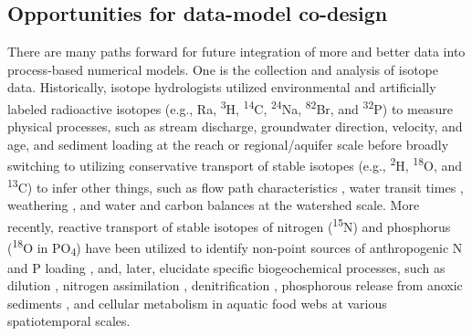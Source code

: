 \documentclass[preprint,review, 12pt]{elsarticle}
\begin{document}
\subsection{Opportunities for data-model co-design}


    There are many paths forward for future integration of more and better data into process-based numerical models. One is the collection and analysis of isotope data. Historically, isotope hydrologists utilized environmental and artificially labeled radioactive isotopes (e.g., Ra, \textsuperscript{3}H, \textsuperscript{14}C, \textsuperscript{24}Na, \textsuperscript{82}Br, and \textsuperscript{32}P) to measure physical processes, such as stream discharge, groundwater direction, velocity, and age, and sediment loading at the reach or regional/aquifer scale \citep{Joly1922, Agency1963, Agency1967} before broadly switching to utilizing conservative transport of stable isotopes (e.g., \textsuperscript{2}H, \textsuperscript{18}O, and \textsuperscript{13}C) to infer other things, such as flow path characteristics \citep{Klaus2013}, water transit times \citep{McGuire2006}, weathering \citep{Schulte2011}, and water \citep{Agency} and carbon \citep{Dawson2011} balances at the watershed scale. More recently, reactive transport of stable isotopes of nitrogen (\textsuperscript{15}N) and phosphorus (\textsuperscript{18}O in PO\textsubscript{4}) have been utilized to identify non-point sources of anthropogenic N \citep{Fry1999, Lake2001, Spoelstra2001, Robinson2001, Mayer2002, M.JakeVanderZanden2005, Kendall2008, Savard2010, Nestler2011, Kaushal2011} and P loading \citep{McLaughlin2006, Elsbury2009, Paytan2012, Granger2017, Tonderski2017, Ishida2019}, and, later, elucidate specific biogeochemical processes, such as dilution \citep{Archana2018}, nitrogen assimilation \citep{Deutsch2009, Nikolenko2018}, denitrification \citep{Wexler2014}, phosphorous release from anoxic sediments \citep{Elsbury2009}, and cellular metabolism in aquatic food webs \citep{Davies2014} at various spatiotemporal scales.
            
\end{document}
